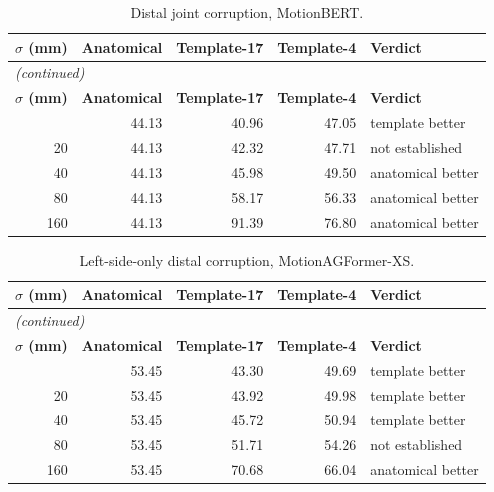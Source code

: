 \vspace{0.6cm}

\begin{center}
{\fontsize{10}{12}\selectfont
\begin{longtable}{rrrrl}
\caption{Distal joint corruption, MotionBERT.}\label{tab:appocclusion_motionbert}\\
\hline
\textbf{$\sigma$ (mm)} & \textbf{Anatomical} & \textbf{Template-17} & \textbf{Template-4} & \textbf{Verdict} \\
\hline
\endfirsthead
\multicolumn{5}{l}{\textit{(continued)}}\\
\hline
\textbf{$\sigma$ (mm)} & \textbf{Anatomical} & \textbf{Template-17} & \textbf{Template-4} & \textbf{Verdict} \\
\hline
\endhead
\hline
\endfoot
0 & 44.13 & 40.96 & 47.05 & template better \\
20 & 44.13 & 42.32 & 47.71 & not established \\
40 & 44.13 & 45.98 & 49.50 & anatomical better \\
80 & 44.13 & 58.17 & 56.33 & anatomical better \\
160 & 44.13 & 91.39 & 76.80 & anatomical better \\
\end{longtable}
}
\end{center}

\vspace{0.6cm}

\begin{center}
{\fontsize{10}{12}\selectfont
\begin{longtable}{rrrrl}
\caption{Left-side-only distal corruption, MotionAGFormer-XS.}\label{tab:appasymmetric_xs}\\
\hline
\textbf{$\sigma$ (mm)} & \textbf{Anatomical} & \textbf{Template-17} & \textbf{Template-4} & \textbf{Verdict} \\
\hline
\endfirsthead
\multicolumn{5}{l}{\textit{(continued)}}\\
\hline
\textbf{$\sigma$ (mm)} & \textbf{Anatomical} & \textbf{Template-17} & \textbf{Template-4} & \textbf{Verdict} \\
\hline
\endhead
\hline
\endfoot
0 & 53.45 & 43.30 & 49.69 & template better \\
20 & 53.45 & 43.92 & 49.98 & template better \\
40 & 53.45 & 45.72 & 50.94 & template better \\
80 & 53.45 & 51.71 & 54.26 & not established \\
160 & 53.45 & 70.68 & 66.04 & anatomical better \\
\end{longtable}
}
\end{center}

